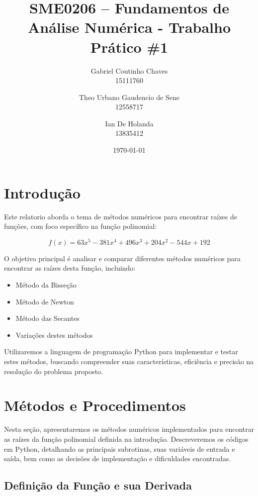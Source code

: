 \documentclass{article}
\title{SME0206 -- Fundamentos de An\'{a}lise Num\'{e}rica - Trabalho Pr\'{a}tico \#1}
\author{Gabriel Coutinho Chaves \\ 15111760 \and Theo Urbano Gaudencio de Sene \\ 12558717 \and Ian De Holanda \\ 13835412}
\date{\today}
\begin{document}
\maketitle


\section{Introdu\c{c}\~{a}o}
Este relatorio aborda o tema de m\'{e}todos num\'{e}ricos para encontrar ra\'{i}zes de fun\c{c}\~{o}es, com foco espec\'{i}fico na fun\c{c}\~{a}o polinomial:


\begin{equation}
    f(x) = 63x^5 - 381x^4 + 496x^3 + 204x^2 - 544x + 192
\end{equation}

O objetivo principal \'{e} analisar e comparar diferentes m\'{e}todos num\'{e}ricos para encontrar as ra\'{i}zes desta fun\c{c}\~{a}o, incluindo:

\begin{itemize}
    \item M\'{e}todo da Bisse\c{c}\~{a}o
    \item M\'{e}todo de Newton
    \item M\'{e}todo das Secantes
    \item Varia\c{c}\~{o}es destes m\'{e}todos
\end{itemize}

Utilizaremos a linguagem de programa\c{c}\~{a}o Python para implementar e testar estes m\'{e}todos, buscando compreender suas caracter\'{i}sticas, efici\^{e}ncia e precis\~{a}o na resolu\c{c}\~{a}o do problema proposto.




\section{M\'{e}todos e Procedimentos}
Nesta se\c{c}\~{a}o, apresentaremos os m\'{e}todos num\'{e}ricos implementados para encontrar as ra\'{i}zes da fun\c{c}\~{a}o polinomial definida na introdu\c{c}\~{a}o. Descreveremos os c\'{o}digos em Python, detalhando as principais subrotinas, suas vari\'{a}veis de entrada e sa\'{i}da, bem como as decis\~{o}es de implementa\c{c}\~{a}o e dificuldades encontradas.

\subsection{Defini\c{c}\~{a}o da Fun\c{c}\~{a}o e sua Derivada}
\end{document}
